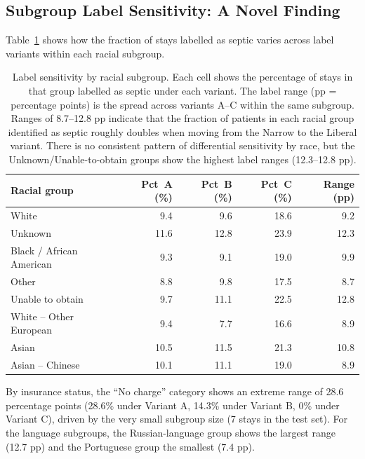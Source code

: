\subsection{Subgroup Label Sensitivity: A Novel Finding}

Table~\ref{tab:equity_label} shows how the fraction of stays labelled as septic
varies across label variants within each racial subgroup.

\begin{table}[H]
  \centering
  \begin{tabular}{lrrrr}
    \toprule
    \textbf{Racial group} & \textbf{Pct\ A (\%)} & \textbf{Pct\ B (\%)}
      & \textbf{Pct\ C (\%)} & \textbf{Range (pp)} \\
    \midrule
    White                    & 9.4 & 9.6 & 18.6 & 9.2 \\
    Unknown                  & 11.6 & 12.8 & 23.9 & 12.3 \\
    Black / African American & 9.3 & 9.1 & 19.0 & 9.9 \\
    Other                    & 8.8 & 9.8 & 17.5 & 8.7 \\
    Unable to obtain         & 9.7 & 11.1 & 22.5 & 12.8 \\
    White -- Other European  & 9.4 & 7.7 & 16.6 & 8.9 \\
    Asian                    & 10.5 & 11.5 & 21.3 & 10.8 \\
    Asian -- Chinese         & 10.1 & 11.1 & 19.0 & 8.9 \\
    \bottomrule
  \end{tabular}
  \caption{Label sensitivity by racial subgroup. Each cell shows the percentage
  of stays in that group labelled as septic under each variant. The label range
  (pp = percentage points) is the spread across variants A--C within the same
  subgroup. Ranges of 8.7--12.8 pp indicate that the fraction of patients in
  each racial group identified as septic roughly doubles when moving from the
  Narrow to the Liberal variant. There is no consistent pattern of differential
  sensitivity by race, but the Unknown/Unable-to-obtain groups show the highest
  label ranges (12.3--12.8 pp).}
  \label{tab:equity_label}
\end{table}

By insurance status, the ``No charge'' category shows an extreme range of 28.6
percentage points (28.6\% under Variant A, 14.3\% under Variant B, 0\% under
Variant C), driven by the very small subgroup size (7 stays in the test set).
For the language subgroups, the Russian-language group shows the largest range
(12.7 pp) and the Portuguese group the smallest (7.4 pp).

